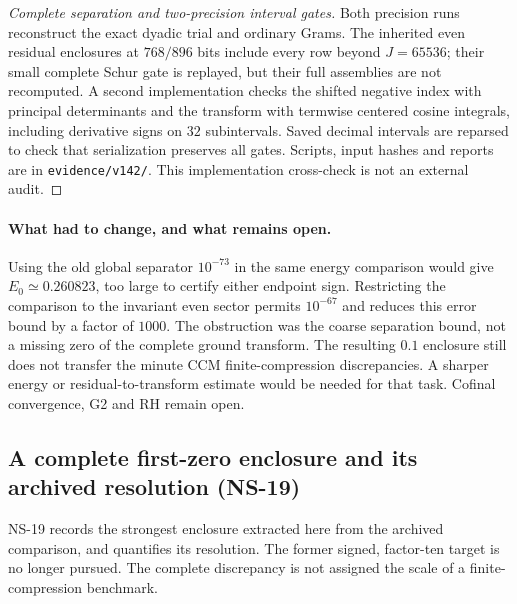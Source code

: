 \documentclass[11pt]{article}
\theoremstyle{remark}
\begin{document}
\begin{proof}[Complete separation and two-precision interval gates]
Both precision runs reconstruct the exact dyadic trial and ordinary
Grams. The inherited even residual enclosures at $768/896$ bits
include every row beyond $J=65536$; their small complete Schur gate
is replayed, but their full assemblies are not recomputed.
A second implementation checks the shifted negative index with
principal determinants and the transform with termwise centered
cosine integrals, including derivative signs on $32$ subintervals.
Saved decimal intervals are reparsed to check that serialization
preserves all gates. Scripts, input hashes and reports are in
\texttt{evidence/v142/}. This implementation cross-check is not an
external audit.
\end{proof}

\paragraph{What had to change, and what remains open.}
Using the old global separator $10^{-73}$ in the same energy comparison
would give $E_0\simeq0.260823$, too large to certify either endpoint
sign. Restricting the comparison to the invariant even sector permits
$10^{-67}$ and reduces this error bound by a factor of $1000$.
The obstruction was the coarse separation bound, not a missing zero
of the complete ground transform. The resulting $0.1$ enclosure
still does not transfer the minute CCM finite-compression discrepancies.
A sharper energy or residual-to-transform estimate would be needed
for that task. Cofinal convergence, G2 and RH remain open.


\subsection*{A complete first-zero enclosure and its archived resolution (NS-19)}

NS-19 records the strongest enclosure extracted here from the archived
comparison, and quantifies its resolution. The former signed, factor-ten
target is no longer pursued. The complete discrepancy is not assigned the
scale of a finite-compression benchmark.
\end{document}
